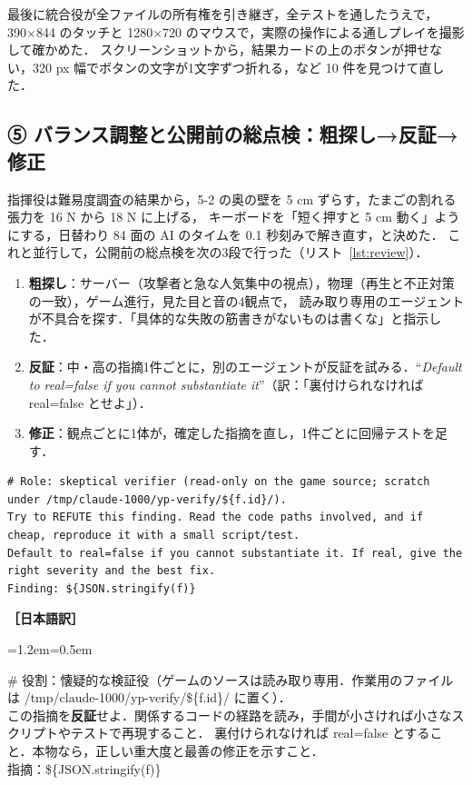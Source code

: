 \documentclass[a4paper,10pt]{ltjsarticle}
\newcommand{\lstref}[1]{リスト~\ref{#1}}
\newenvironment{yaku}{\par\vspace{-2pt}\small\noindent\textbf{［日本語訳］}\par\nopagebreak\begin{list}{}{\leftmargin=1.2em\rightmargin=0.5em\topsep=1pt}\item\relax}{\end{list}\vspace{4pt}}
\begin{document}
最後に統合役が全ファイルの所有権を引き継ぎ，全テストを通したうえで，
390×844 のタッチと 1280×720 のマウスで，実際の操作による通しプレイを撮影して確かめた．
スクリーンショットから，結果カードの上のボタンが押せない，320 px 幅でボタンの文字が1文字ずつ折れる，など 10 件を見つけて直した．

\subsection{⑤ バランス調整と公開前の総点検：粗探し→反証→修正}

指揮役は難易度調査の結果から，5-2 の奥の壁を 5 cm ずらす，たまごの割れる張力を 16 N から 18 N に上げる，
キーボードを「短く押すと 5 cm 動く」ようにする，日替わり 84 面の AI のタイムを 0.1 秒刻みで解き直す，と決めた．
これと並行して，公開前の総点検を次の3段で行った（\lstref{lst:review}）．

\begin{enumerate}
  \item \textbf{粗探し}：サーバー（攻撃者と急な人気集中の視点），物理（再生と不正対策の一致），ゲーム進行，見た目と音の4観点で，
  読み取り専用のエージェントが不具合を探す．「具体的な失敗の筋書きがないものは書くな」と指示した．
  \item \textbf{反証}：中・高の指摘1件ごとに，別のエージェントが反証を試みる．``\textit{Default to real=false if you cannot substantiate it}''（訳：「裏付けられなければ real=false とせよ」）．
  \item \textbf{修正}：観点ごとに1体が，確定した指摘を直し，1件ごとに回帰テストを足す．
\end{enumerate}

\begin{lstlisting}[caption={反証役へのプロンプト（全文）},label={lst:review}]
# Role: skeptical verifier (read-only on the game source; scratch under /tmp/claude-1000/yp-verify/${f.id}/).
Try to REFUTE this finding. Read the code paths involved, and if cheap, reproduce it with a small script/test.
Default to real=false if you cannot substantiate it. If real, give the right severity and the best fix.
Finding: ${JSON.stringify(f)}
\end{lstlisting}
\begin{yaku}
\# 役割：懐疑的な検証役（ゲームのソースは読み取り専用．作業用のファイルは /tmp/claude-1000/yp-verify/\$\{f.id\}/ に置く）．\\
この指摘を\textbf{反証}せよ．関係するコードの経路を読み，手間が小さければ小さなスクリプトやテストで再現すること．
裏付けられなければ real=false とすること．本物なら，正しい重大度と最善の修正を示すこと．\\
指摘：\$\{JSON.stringify(f)\}
\end{yaku}
\end{document}
